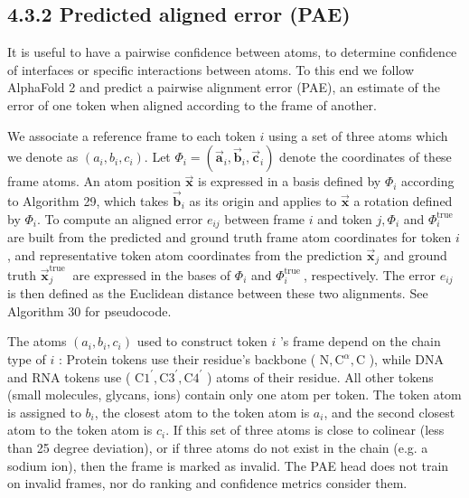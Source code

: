 \documentclass[10pt]{article}
\begin{document}
\subsection*{4.3.2 Predicted aligned error (PAE)}
It is useful to have a pairwise confidence between atoms, to determine confidence of interfaces or specific interactions between atoms. To this end we follow AlphaFold 2 and predict a pairwise alignment error (PAE), an estimate of the error of one token when aligned according to the frame of another.

We associate a reference frame to each token $i$ using a set of three atoms which we denote as $\left(a_{i}, b_{i}, c_{i}\right)$. Let $\Phi_{i}=\left(\overrightarrow{\mathbf{a}}_{i}, \overrightarrow{\mathbf{b}}_{i}, \overrightarrow{\mathbf{c}}_{i}\right)$ denote the coordinates of these frame atoms. An atom position $\overrightarrow{\mathbf{x}}$ is expressed in a basis defined by $\Phi_{i}$ according to Algorithm 29, which takes $\overrightarrow{\mathbf{b}}_{i}$ as its origin and applies to $\overrightarrow{\mathbf{x}}$ a rotation defined by $\Phi_{i}$. To compute an aligned error $e_{i j}$ between frame $i$ and token $j, \Phi_{i}$ and $\Phi_{i}^{\text {true }}$ are built from the predicted and ground truth frame atom coordinates for token $i$, and representative token atom coordinates from the prediction $\overrightarrow{\mathbf{x}}_{j}$ and ground truth $\overrightarrow{\mathbf{x}}_{j}^{\text {true }}$ are expressed in the bases of $\Phi_{i}$ and $\Phi_{i}^{\text {true }}$, respectively. The error $e_{i j}$ is then defined as the Euclidean distance between these two alignments. See Algorithm 30 for pseudocode.

The atoms $\left(a_{i}, b_{i}, c_{i}\right)$ used to construct token $i$ 's frame depend on the chain type of $i$ : Protein tokens use their residue's backbone ( $\mathrm{N}, \mathrm{C}^{\alpha}, \mathrm{C}$ ), while DNA and RNA tokens use ( $\mathrm{C} 1^{\prime}, \mathrm{C} 3^{\prime}, \mathrm{C} 4^{\prime}$ ) atoms of their residue. All other tokens (small molecules, glycans, ions) contain only one atom per token. The token atom is assigned to $b_{i}$, the closest atom to the token atom is $a_{i}$, and the second closest atom to the token atom is $c_{i}$. If this set of three atoms is close to colinear (less than 25 degree deviation), or if three atoms do not exist in the chain (e.g. a sodium ion), then the frame is marked as invalid. The PAE head does not train on invalid frames, nor do ranking and confidence metrics consider them.
\end{document}

